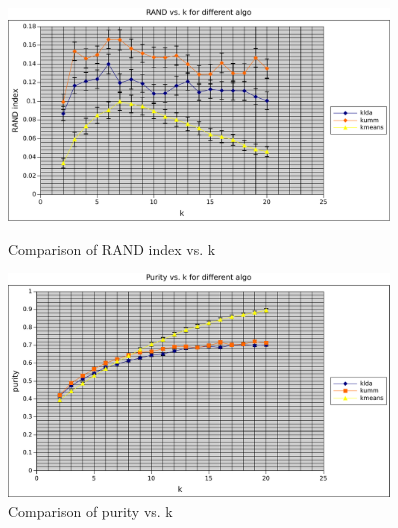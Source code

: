 \begin{figure}
    \centering
    \begin{minipage}{0.45\textwidth}
        \centering
        \includegraphics[width=0.9\textwidth]{rand_comp.pdf}
        \caption{Comparison of RAND index vs. k}
    \end{minipage}\hfill
    \begin{minipage}{0.45\textwidth}
        \centering
        \includegraphics[width=0.9\textwidth]{purity_comp.pdf}
        \caption{Comparison of purity vs. k}
    \end{minipage}
\end{figure}
